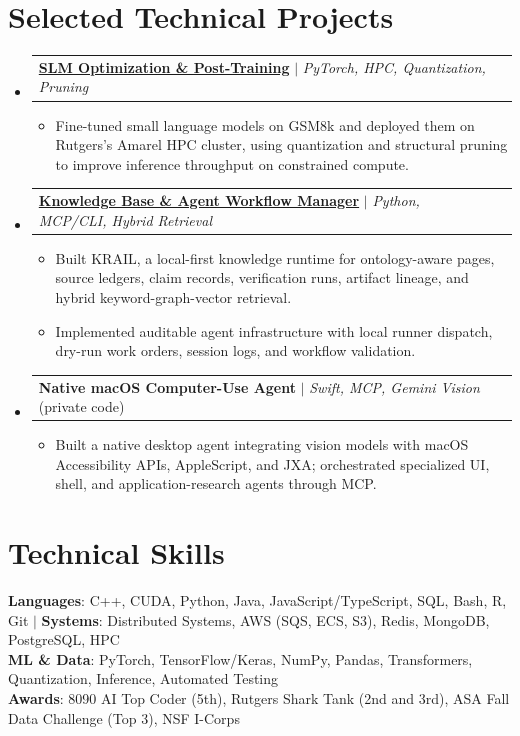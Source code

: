 \documentclass[letterpaper,11pt]{article}
\makeatletter
\newcommand{\resumeItem}[1]{
  \item\small{
    {#1 \vspace{-2pt}}
  }
}
\newcommand{\resumeProjectHeading}[2]{
    \item
    \begin{tabular*}{0.97\textwidth}{l@{\extracolsep{\fill}}r}
      \small#1 & #2 \\
    \end{tabular*}\vspace{-7pt}
}
\newcommand{\resumeSubHeadingListStart}{\begin{itemize}[leftmargin=0.15in, label={}]}
\newcommand{\resumeSubHeadingListEnd}{\end{itemize}}
\newcommand{\resumeItemListStart}{\begin{itemize}}
\newcommand{\resumeItemListEnd}{\end{itemize}\vspace{-5pt}}
\makeatother
\begin{document}
\section{Selected Technical Projects}
  \resumeSubHeadingListStart
    \resumeProjectHeading
      {\href{https://github.com/AkeBoss-tech/llm-research}{\textbf{SLM Optimization \& Post-Training}} $|$ \emph{PyTorch, HPC, Quantization, Pruning}}{}
      \resumeItemListStart
        \resumeItem{Fine-tuned small language models on GSM8k and deployed them on Rutgers's Amarel HPC cluster, using quantization and structural pruning to improve inference throughput on constrained compute.}
      \resumeItemListEnd
    \resumeProjectHeading
      {\href{https://github.com/AkeBoss-tech/knowledge}{\textbf{Knowledge Base \& Agent Workflow Manager}} $|$ \emph{Python, MCP/CLI, Hybrid Retrieval}}{}
      \resumeItemListStart
        \resumeItem{Built KRAIL, a local-first knowledge runtime for ontology-aware pages, source ledgers, claim records, verification runs, artifact lineage, and hybrid keyword-graph-vector retrieval.}
        \resumeItem{Implemented auditable agent infrastructure with local runner dispatch, dry-run work orders, session logs, and workflow validation.}
      \resumeItemListEnd
    \resumeProjectHeading
      {\textbf{Native macOS Computer-Use Agent} $|$ \emph{Swift, MCP, Gemini Vision} (private code)}{}
      \resumeItemListStart
        \resumeItem{Built a native desktop agent integrating vision models with macOS Accessibility APIs, AppleScript, and JXA; orchestrated specialized UI, shell, and application-research agents through MCP.}
      \resumeItemListEnd
  \resumeSubHeadingListEnd
\section{Technical Skills}
 \begin{itemize}[leftmargin=0.15in, label={}]
    \small{\item{
     \textbf{Languages}{: C++, CUDA, Python, Java, JavaScript/TypeScript, SQL, Bash, R, Git} $|$
     \textbf{Systems}{: Distributed Systems, AWS (SQS, ECS, S3), Redis, MongoDB, PostgreSQL, HPC} \\
     \textbf{ML \& Data}{: PyTorch, TensorFlow/Keras, NumPy, Pandas, Transformers, Quantization, Inference, Automated Testing} \\
     \textbf{Awards}{: 8090 AI Top Coder (5th), Rutgers Shark Tank (2nd and 3rd), ASA Fall Data Challenge (Top 3), NSF I-Corps}
    }}
 \end{itemize}
\end{document}
